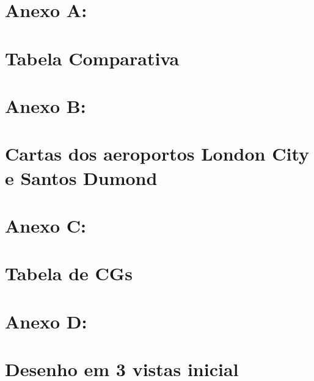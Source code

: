 \part*{Anexo A:\\~\\ Tabela Comparativa}
\label{anexoA}
  

\part*{Anexo B:\\~\\ Cartas dos aeroportos London City e Santos Dumond}
\label{anexoB}
  
  
  

\part*{Anexo C:\\~\\ Tabela de CGs}
\label{anexoC}
  

\part*{Anexo D:\\~\\ Desenho em 3 vistas inicial}
\label{anexoD}
  
